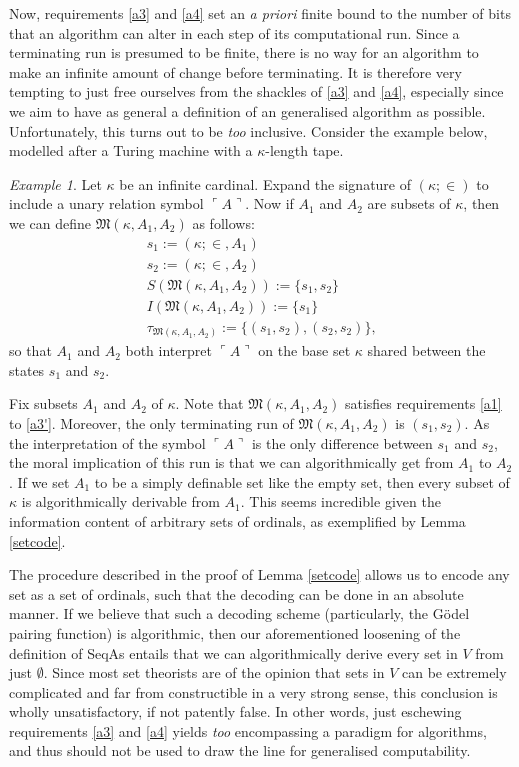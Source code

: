 \documentclass[12pt, twoside]{memoir}
\numberwithin{equation}{section}
\theoremstyle{definition}
\theoremstyle{remark}
\newtheorem{ex}[thm]{Example}
\theoremstyle{definition}
\theoremstyle{definition}
\theoremstyle{definition}
\theoremstyle{remark}
\begin{document}
Now, requirements \ref{a3} and \ref{a4} set an \textit{a priori} finite bound to the number of bits that an algorithm can alter in each step of its computational run. Since a terminating run is presumed to be finite, there is no way for an algorithm to make an infinite amount of change before terminating. It is therefore very tempting to just free ourselves from the shackles of \ref{a3} and \ref{a4}, especially since we aim to have as general a definition of an generalised algorithm as possible. Unfortunately, this turns out to be \textit{too} inclusive. Consider the example below, modelled after a Turing machine with a $\kappa$-length tape.

\begin{ex}\label{ex21}
Let $\kappa$ be an infinite cardinal. Expand the signature of $(\kappa; \in)$ to include a unary relation symbol $\ulcorner A \urcorner$. Now if $A_1$ and $A_2$ are subsets of $\kappa$, then we can define $\mathfrak{M}(\kappa, A_1, A_2)$ as follows:
\begin{gather*}
    s_1 := (\kappa; \in, A_1) \\
    s_2 := (\kappa; \in, A_2) \\
    S(\mathfrak{M}(\kappa, A_1, A_2)) := \{s_1, s_2\} \\
    I(\mathfrak{M}(\kappa, A_1, A_2)) := \{s_1\} \\
    \tau_{\mathfrak{M}(\kappa, A_1, A_2)} := \{(s_1, s_2), (s_2, s_2)\} \text{,}
\end{gather*}
so that $A_1$ and $A_2$ both interpret $\ulcorner A \urcorner$ on the base set $\kappa$ shared between the states $s_1$ and $s_2$. 
\end{ex}

Fix subsets $A_1$ and $A_2$ of $\kappa$. Note that $\mathfrak{M}(\kappa, A_1, A_2)$ satisfies requirements \ref{a1} to \ref{a3'}. Moreover, the only terminating run of $\mathfrak{M}(\kappa, A_1, A_2)$ is $(s_1, s_2)$. As the interpretation of the symbol $\ulcorner A \urcorner$ is the only difference between $s_1$ and $s_2$, the moral implication of this run is that we can algorithmically get from $A_1$ to $A_2$. If we set $A_1$ to be a simply definable set like the empty set, then every subset of $\kappa$ is algorithmically derivable from $A_1$. This seems incredible given the information content of arbitrary sets of ordinals, as exemplified by Lemma \ref{setcode}.

The procedure described in the proof of Lemma \ref{setcode} allows us to encode any set as a set of ordinals, such that the decoding can be done in an absolute manner. If we believe that such a decoding scheme (particularly, the G\"{o}del pairing function) is algorithmic, then our aforementioned loosening of the definition of SeqAs entails that we can algorithmically derive every set in $V$ from just $\emptyset$. Since most set theorists are of the opinion that sets in $V$ can be extremely complicated and far from constructible in a very strong sense, this conclusion is wholly unsatisfactory, if not patently false. In other words, just eschewing requirements \ref{a3} and \ref{a4} yields \emph{too} encompassing a paradigm for algorithms, and thus should not be used to draw the line for generalised computability.
\end{document}
